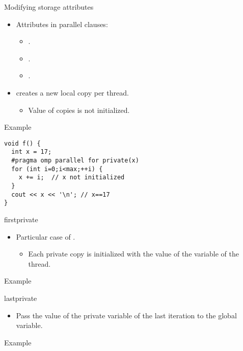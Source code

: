 \begin{frame}[t,fragile]{Modifying storage attributes}
\begin{itemize}
  \item Attributes in parallel clauses:
    \begin{itemize}
      \item {}.
      \item {}.
      \item {}.
    \end{itemize}

  \item {} creates a new local copy per thread.
    \begin{itemize}
      \item Value of copies is not initialized.
    \end{itemize}
\end{itemize}

\begin{block}{Example}
\begin{lstlisting}
void f() {
  int x = 17;
  #pragma omp parallel for private(x) 
  for (int i=0;i<max;++i) {
    x += i;  // x not initialized
  }
  cout << x << '\n'; // x==17
}
\end{lstlisting}
\end{block}
\end{frame}

\begin{frame}[t,fragile]{firstprivate}
\begin{itemize}
  \item Particular case of .
    \begin{itemize}
      \item Each private copy is initialized with the value of the variable
            of the  thread.
    \end{itemize}
\end{itemize}

\begin{block}{Example}

\end{block}
\end{frame}

\begin{frame}[t,fragile]{lastprivate}
\begin{itemize}
  \item Pass the value of the private variable of the last  iteration
        to the global variable.
\end{itemize}

\begin{block}{Example}

\end{block}
\end{frame}

